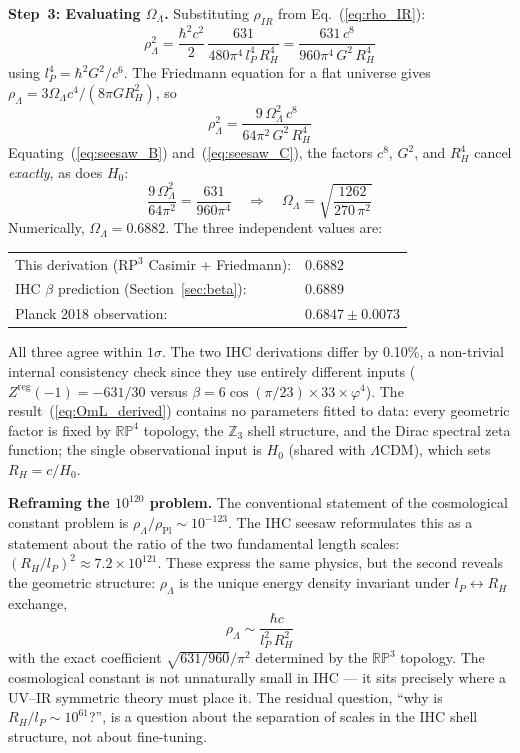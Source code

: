 \documentclass[12pt,a4paper]{article}
\begin{document}
\textbf{Step~3: Evaluating $\Omega_\Lambda$.}
Substituting $\rho_{IR}$ from Eq.~(\ref{eq:rho_IR}):
\begin{equation}
  \rho_\Lambda^2
  = \frac{\hbar^2 c^2}{2}\,\frac{631}{480\pi^4\,l_P^4\,R_H^4}
  = \frac{631\,c^8}{960\pi^4\,G^2\,R_H^4}
  \label{eq:seesaw_B}
\end{equation}
using $l_P^4 = \hbar^2 G^2/c^6$.  The Friedmann equation for a flat universe gives
$\rho_\Lambda = 3\Omega_\Lambda c^4/(8\pi G R_H^2)$, so
\begin{equation}
  \rho_\Lambda^2 = \frac{9\,\Omega_\Lambda^2\,c^8}{64\pi^2\,G^2\,R_H^4}
  \label{eq:seesaw_C}
\end{equation}
Equating~(\ref{eq:seesaw_B}) and~(\ref{eq:seesaw_C}), the factors $c^8$,
$G^2$, and $R_H^4$ cancel \emph{exactly}, as does $H_0$:
\begin{equation}
  \frac{9\,\Omega_\Lambda^2}{64\pi^2}
  = \frac{631}{960\pi^4}
  \quad\Longrightarrow\quad
  \boxed{\Omega_\Lambda = \sqrt{\frac{1262}{270\,\pi^2}}}
  \label{eq:OmL_derived}
\end{equation}
Numerically, $\Omega_\Lambda = 0.6882$.  The three independent values are:
\begin{center}
\begin{tabular}{ll}
  This derivation (RP$^3$ Casimir + Friedmann): & $0.6882$ \\
  IHC $\beta$ prediction (Section~\ref{sec:beta}): & $0.6889$ \\
  Planck 2018 observation: & $0.6847\pm0.0073$
\end{tabular}
\end{center}
All three agree within $1\sigma$.  The two IHC derivations differ by 0.10\%,
a non-trivial internal consistency check since they use entirely different inputs
($Z^\mathrm{reg}(-1) = -631/30$ versus $\beta = 6\cos(\pi/23)\times33\times\varphi^4$).
The result~(\ref{eq:OmL_derived}) contains no parameters fitted to data: every
geometric factor is fixed by $\mathbb{RP}^4$ topology, the $\mathbb{Z}_3$ shell
structure, and the Dirac spectral zeta function; the single observational input
is $H_0$ (shared with $\Lambda$CDM), which sets $R_H = c/H_0$.

\textbf{Reframing the $10^{120}$ problem.}
The conventional statement of the cosmological constant problem is
$\rho_\Lambda/\rho_\mathrm{Pl} \sim 10^{-123}$.  The IHC seesaw reformulates
this as a statement about the ratio of the two fundamental length scales:
$(R_H/l_P)^2 \approx 7.2\times10^{121}$.  These express the same physics,
but the second reveals the geometric structure: $\rho_\Lambda$ is the
unique energy density invariant under $l_P \leftrightarrow R_H$ exchange,
\begin{equation}
  \rho_\Lambda \sim \frac{\hbar c}{l_P^2\,R_H^2}
\end{equation}
with the exact coefficient $\sqrt{631/960}/\pi^2$ determined by the
$\mathbb{RP}^3$ topology.  The cosmological constant is not unnaturally small
in IHC --- it sits precisely where a UV--IR symmetric theory must place it.
The residual question, ``why is $R_H/l_P \sim 10^{61}$?'', is a question about
the separation of scales in the IHC shell structure, not about fine-tuning.
\end{document}
